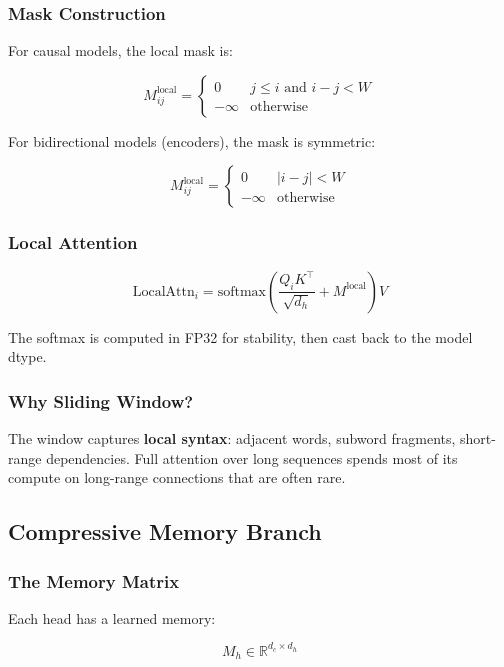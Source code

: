 \subsubsection{Mask Construction}

For causal models, the local mask is:

\[
M_{ij}^\text{local} = \begin{cases} 0 & j \leq i \text{ and } i - j < W \\ -\infty & \text{otherwise} \end{cases}
\tag{4.1}
\]

For bidirectional models (encoders), the mask is symmetric:

\[
M_{ij}^\text{local} = \begin{cases} 0 & |i - j| < W \\ -\infty & \text{otherwise} \end{cases}
\tag{4.2}
\]

\subsubsection{Local Attention}

\[
\text{LocalAttn}_i = \text{softmax}\!\left(\frac{Q_i K^\top}{\sqrt{d_h}} + M^\text{local}\right) V
\tag{4.3}
\]

The softmax is computed in FP32 for stability, then cast back to the model 
dtype.

\subsubsection{Why Sliding Window?}

The window captures \textbf{local syntax}: adjacent words, subword fragments, 
short-range dependencies. Full attention over long sequences spends most 
of its compute on long-range connections that are often rare.

\subsection{Compressive Memory Branch}

\subsubsection{The Memory Matrix}

Each head has a learned memory:

\[
M_h \in \mathbb{R}^{d_c \times d_h}
\tag{4.4}
\]

